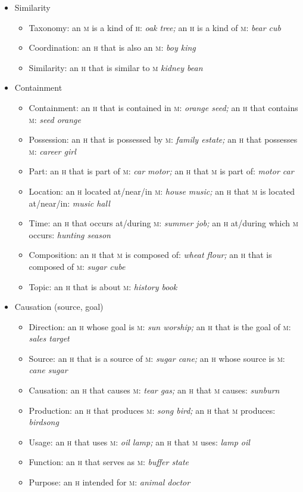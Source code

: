 \documentclass[11pt]{article}
\newcommand{\E}[1]{\textit{#1}}   %
\newcommand{\I}[1]{\textsc{#1}}   %
\newenvironment{grammarlist}%
 {\begin{itemize}\addtolength{\itemsep}{-0.5\baselineskip}\ignorespaces}%
 {\end{itemize}\ignorespacesafterend}
\begin{document}
{\begin{grammarlist}
  \item Similarity
    \begin{grammarlist}
      \item Taxonomy: an \I{m} is a kind of \I{h}: \E{oak tree;} an
        \I{h} is a kind of \I{m}: \E{bear cub}
      \item Coordination: an \I{h} that is also an \I{m}: \E{boy king}
      \item Similarity: an \I{h} that is similar to \I{m} \E{kidney bean}
    \end{grammarlist}  
  \item Containment
    \begin{grammarlist}
      \item Containment: an \I{h} that is contained in \I{m}:
        \E{orange seed;} an \I{h} that contains \I{m}: \E{seed orange}
      \item Possession: an \I{h} that is possessed by \I{m}: \E{family
        estate;} an \I{h} that possesses \I{m}: \E{career girl}
      \item Part: an \I{h} that is part of \I{m}: \E{car motor;} an
        \I{h} that \I{m} is part of: \E{motor car}
      \item Location: an \I{h} located at/near/in \I{m}: \E{house
        music;} an \I{h} that \I{m} is located at/near/in: \E{music
        hall}
      \item Time: an \I{h} that occurs at/during \I{m}: \E{summer
        job;} an \I{h} at/during which \I{m} occurs: \E{hunting season}
      \item Composition: an \I{h} that \I{m} is composed of: \E{wheat
        flour;} an \I{h} that is composed of \I{m}: \E{sugar cube}
      \item Topic: an \I{h} that is about \I{m}: \E{history book}
    \end{grammarlist}
  \item Causation (source, goal)
    \begin{grammarlist}
      \item Direction: an \I{h} whose goal is \I{m}: \E{sun worship;}
        an \I{h} that is the goal of \I{m}: \E{sales target}
      \item Source: an \I{h} that is a source of \I{m}: \E{sugar cane;}
        an \I{h} whose source is \I{m}: \E{cane sugar}
      \item Causation: an \I{h} that causes \I{m}: \E{tear gas;}
        an \I{h} that \I{m} causes: \E{sunburn}
      \item Production: an \I{h} that produces \I{m}: \E{song bird;}
        an \I{h} that \I{m} produces: \E{birdsong}
      \item Usage: an \I{h} that uses \I{m}: \E{oil lamp;}
        an \I{h} that \I{m} uses: \E{lamp oil}
      \item Function: an \I{h} that serves as \I{m}: \E{buffer state}
      \item Purpose: an \I{h} intended for \I{m}: \E{animal doctor}
    \end{grammarlist}
\end{grammarlist}

}
\end{document}
